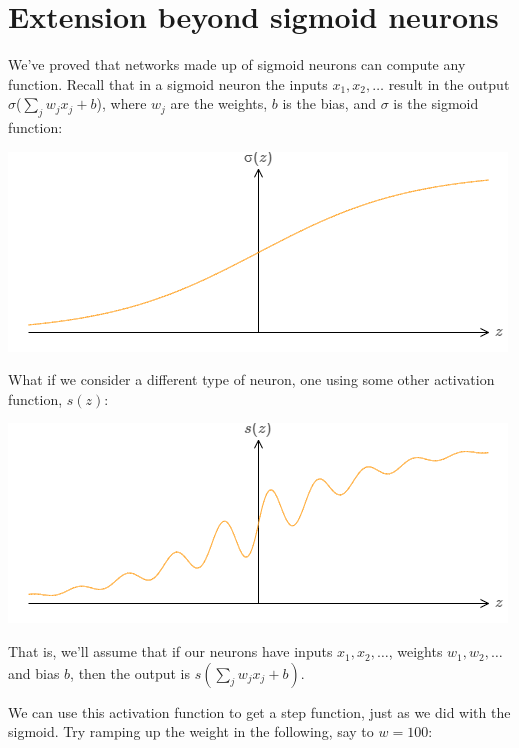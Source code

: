 \documentclass[a4paper,twoside,10pt]{book}
\begin{document}
\section{Extension beyond sigmoid neurons}
We've proved that networks made up of sigmoid neurons can compute any function. Recall that in a sigmoid neuron the inputs $x_1,x_2,\ldots$ result in the output $\sigma$($\sum_jw_jx_j+b$), where $w_j$ are the weights, $b$ is the bias, and $\sigma$ is the sigmoid function:
\begin{center}
	\includegraphics[width=0.7\linewidth]{figures/ch4/tikz451}
\end{center}
What if we consider a different type of neuron, one using some other activation function, $s(z)$:
\begin{center}
	\includegraphics[width=0.7\linewidth]{figures/ch4/tikz452}
\end{center}
That is, we'll assume that if our neurons have inputs $x_1,x_2,\ldots$, weights $w_1,w_2,\ldots$ and bias $b$, then the output is $s(\sum_jw_jx_j+b)$.

We can use this activation function to get a step function, just as we did with the sigmoid. Try ramping up the weight in the following, say to $w=100$:

\end{document}
